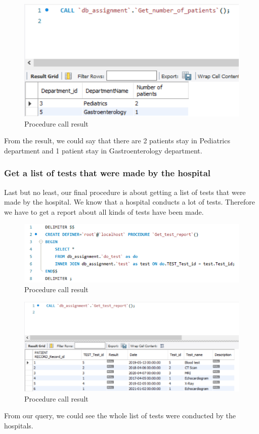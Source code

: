 \begin{figure}[H]
    \centering
    \includegraphics[width = 12cm]{assets/procedure_2b.png}
    \captionsetup{justification=centering,margin=2cm}
    \caption{Procedure call result}
\end{figure}
From the result, we could say that there are 2 patients stay in Pediatrics department and 1 patient stay in Gastroenterology department.

\subsubsection{Get a list of tests that were made by the hospital}
Last but no least, our final procedure is about getting a list of tests that were made by the hospital. We know that a hospital conducts a lot of tests. Therefore we have to get a report about all kinds of tests have been made.

\begin{figure}[H]
    \centering
    \includegraphics[width = 12cm]{assets/procedure_3a.png}
    \captionsetup{justification=centering,margin=2cm}
    \caption{Procedure call result}
\end{figure}

\begin{figure}[H]
    \centering
    \includegraphics[width = 12cm]{assets/procedure_3b.png}
    \captionsetup{justification=centering,margin=2cm}
    \caption{Procedure call result}
\end{figure}

From our query, we could see the whole list of tests were conducted by the hospitals.